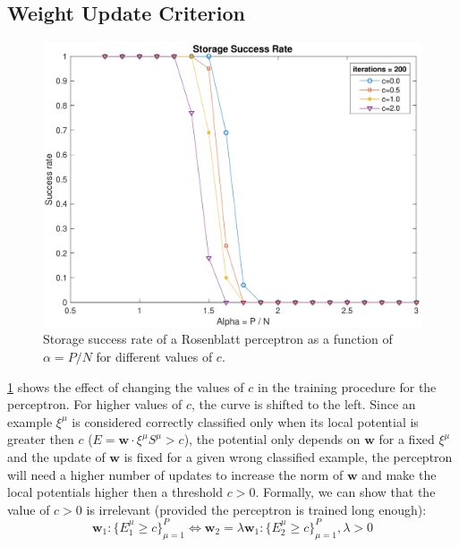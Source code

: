 \subsection{Weight Update Criterion}
\label{subsec:c}
\begin{figure}[t]
	\centering
	\includegraphics[width=\columnwidth]{figures/bonus_2_c}
    \caption{Storage success rate of a Rosenblatt perceptron as a function of $\alpha = P / N$ for different values of $c$.}
	\label{fig:multiple_c}
\end{figure}
\cref{fig:multiple_c} shows the effect of changing the values of $c$ in the training procedure for the perceptron.
For higher values of $c$, the curve is shifted to the left.
Since an example $\xi^\mu$ is considered correctly classified only when its local potential is greater then $c$ ($E = \mathsf{\bm{w}} \cdot \xi^\mu S^\mu > c$), the potential only depends on $\mathsf{\bm{w}}$ for a fixed $\xi^\mu$ and the update of $\mathsf{\bm{w}}$ is fixed for a given wrong classified example, the perceptron will need a higher number of updates to increase the norm of $\mathsf{\bm{w}}$ and make the local potentials higher then a threshold $c > 0$.
Formally, we can show that the value of $c > 0$ is irrelevant (provided the perceptron is trained long enough):
\begin{equation*}
	\mathsf{\bm{w}}_1 : \{E_1^\mu \geq c\}_{\mu = 1}^{P} \Leftrightarrow \mathsf{\bm{w}}_2 = \lambda \mathsf{\bm{w}}_1 : \{E_2^\mu \geq c\}_{\mu = 1}^{P}, \lambda > 0
\end{equation*}

